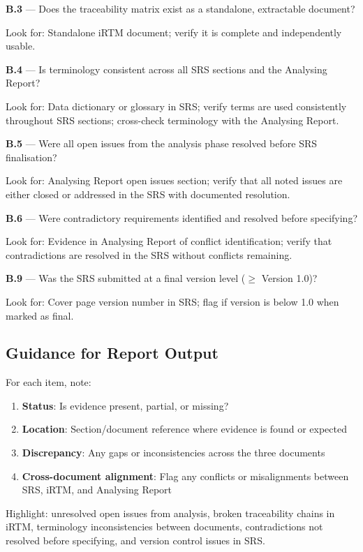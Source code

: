 \documentclass[11pt,a4paper]{article}
\begin{document}
\textbf{B.3} --- Does the traceability matrix exist as a standalone, extractable document?

Look for: Standalone iRTM document; verify it is complete and independently usable.

\textbf{B.4} --- Is terminology consistent across all SRS sections and the Analysing Report?

Look for: Data dictionary or glossary in SRS; verify terms are used consistently throughout SRS sections; cross-check terminology with the Analysing Report.

\textbf{B.5} --- Were all open issues from the analysis phase resolved before SRS finalisation?

Look for: Analysing Report open issues section; verify that all noted issues are either closed or addressed in the SRS with documented resolution.

\textbf{B.6} --- Were contradictory requirements identified and resolved before specifying?

Look for: Evidence in Analysing Report of conflict identification; verify that contradictions are resolved in the SRS without conflicts remaining.

\textbf{B.9} --- Was the SRS submitted at a final version level ($\geq$ Version 1.0)?

Look for: Cover page version number in SRS; flag if version is below 1.0 when marked as final.

\subsection*{Guidance for Report Output}

For each item, note:

\begin{enumerate}
\item \textbf{Status}: Is evidence present, partial, or missing?
\item \textbf{Location}: Section/document reference where evidence is found or expected
\item \textbf{Discrepancy}: Any gaps or inconsistencies across the three documents
\item \textbf{Cross-document alignment}: Flag any conflicts or misalignments between SRS, iRTM, and Analysing Report
\end{enumerate}

Highlight: unresolved open issues from analysis, broken traceability chains in iRTM, terminology inconsistencies between documents, contradictions not resolved before specifying, and version control issues in SRS.
\end{document}
